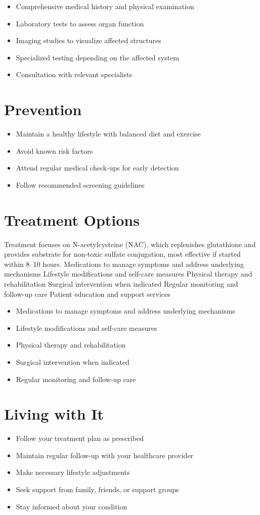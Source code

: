 \begin{itemize}[noitemsep]
  \item Comprehensive medical history and physical examination
  \item Laboratory tests to assess organ function
  \item Imaging studies to visualize affected structures
  \item Specialized testing depending on the affected system
  \item Consultation with relevant specialists
\end{itemize}
\section{Prevention}
\begin{itemize}[noitemsep]
  \item Maintain a healthy lifestyle with balanced diet and exercise
  \item Avoid known risk factors
  \item Attend regular medical check-ups for early detection
  \item Follow recommended screening guidelines
\end{itemize}
\section{Treatment Options}
Treatment focuses on N-acetylcysteine (NAC), which replenishes glutathione and provides substrate for non-toxic sulfate conjugation, most effective if started within 8--10 hours. Medications to manage symptoms and address underlying mechanisms Lifestyle modifications and self-care measures Physical therapy and rehabilitation Surgical intervention when indicated Regular monitoring and follow-up care Patient education and support services

\begin{itemize}[noitemsep]
  \item Medications to manage symptoms and address underlying mechanisms
  \item Lifestyle modifications and self-care measures
  \item Physical therapy and rehabilitation
  \item Surgical intervention when indicated
  \item Regular monitoring and follow-up care
\end{itemize}
\section{Living with It}
\begin{itemize}[noitemsep]
  \item Follow your treatment plan as prescribed
  \item Maintain regular follow-up with your healthcare provider
  \item Make necessary lifestyle adjustments
  \item Seek support from family, friends, or support groups
  \item Stay informed about your condition
\end{itemize}
